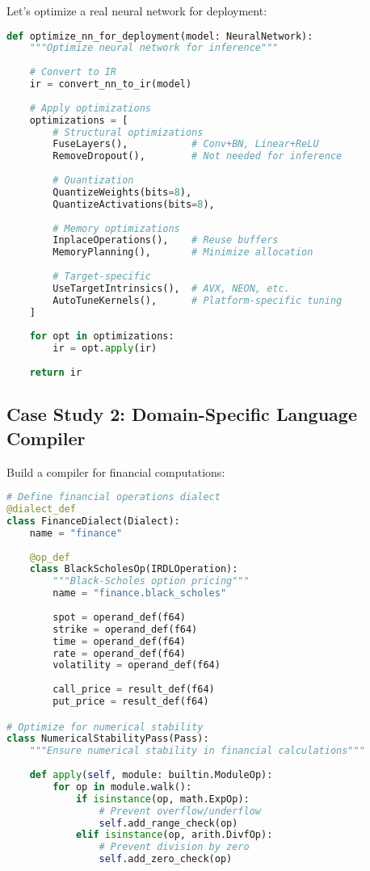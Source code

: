 \documentclass[11pt,a4paper]{article}
\begin{document}
Let's optimize a real neural network for deployment:

\begin{lstlisting}[language=Python, caption=Neural Network Optimization Pipeline]
def optimize_nn_for_deployment(model: NeuralNetwork):
    """Optimize neural network for inference"""
    
    # Convert to IR
    ir = convert_nn_to_ir(model)
    
    # Apply optimizations
    optimizations = [
        # Structural optimizations
        FuseLayers(),           # Conv+BN, Linear+ReLU
        RemoveDropout(),        # Not needed for inference
        
        # Quantization
        QuantizeWeights(bits=8),
        QuantizeActivations(bits=8),
        
        # Memory optimizations
        InplaceOperations(),    # Reuse buffers
        MemoryPlanning(),       # Minimize allocation
        
        # Target-specific
        UseTargetIntrinsics(),  # AVX, NEON, etc.
        AutoTuneKernels(),      # Platform-specific tuning
    ]
    
    for opt in optimizations:
        ir = opt.apply(ir)
    
    return ir
\end{lstlisting}

\subsection{Case Study 2: Domain-Specific Language Compiler}

Build a compiler for financial computations:

\begin{lstlisting}[language=Python, caption=Financial DSL Compiler]
# Define financial operations dialect
@dialect_def
class FinanceDialect(Dialect):
    name = "finance"
    
    @op_def
    class BlackScholesOp(IRDLOperation):
        """Black-Scholes option pricing"""
        name = "finance.black_scholes"
        
        spot = operand_def(f64)
        strike = operand_def(f64)
        time = operand_def(f64)
        rate = operand_def(f64)
        volatility = operand_def(f64)
        
        call_price = result_def(f64)
        put_price = result_def(f64)

# Optimize for numerical stability
class NumericalStabilityPass(Pass):
    """Ensure numerical stability in financial calculations"""
    
    def apply(self, module: builtin.ModuleOp):
        for op in module.walk():
            if isinstance(op, math.ExpOp):
                # Prevent overflow/underflow
                self.add_range_check(op)
            elif isinstance(op, arith.DivfOp):
                # Prevent division by zero
                self.add_zero_check(op)
\end{lstlisting}
\end{document}
